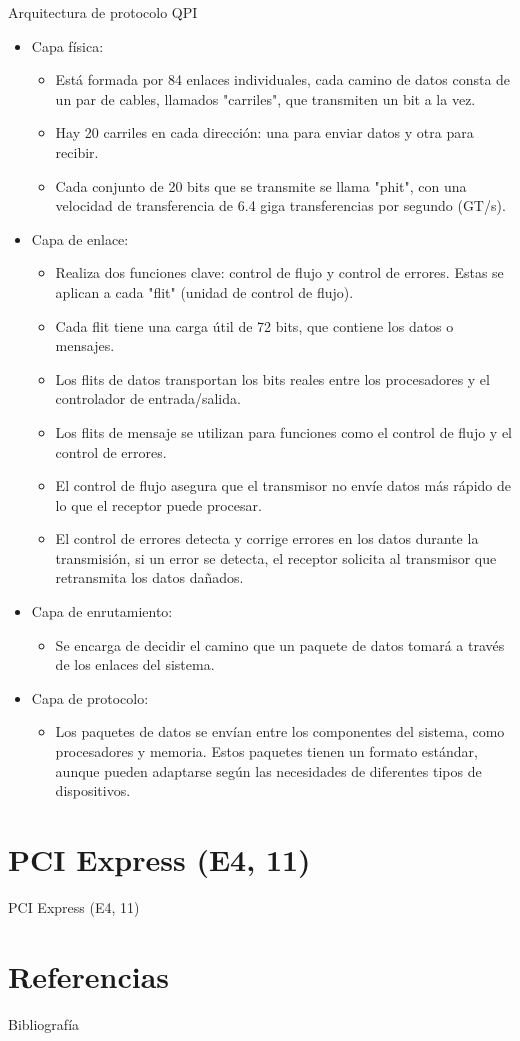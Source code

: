 \documentclass[presentation]{beamer}
\begin{document}
\begin{frame}[label={sec:org86886b9}]{Arquitectura de protocolo QPI}
\begin{itemize}
\item \alert{\alert{Capa física:}}
\begin{itemize}
\item Está formada por 84 enlaces individuales, cada camino de datos consta de un par de cables,
llamados "carriles", que transmiten un bit a la vez.
\item Hay 20 carriles en cada dirección: una para enviar datos y otra para recibir.
\item Cada conjunto de 20 bits que se transmite se llama "phit", con una velocidad de transferencia
de 6.4 giga transferencias por segundo (GT/s).
\end{itemize}
\item \alert{\alert{Capa de enlace:}}
\begin{itemize}
\item Realiza dos funciones clave: control de flujo y control de errores.
Estas se aplican a cada "flit" (unidad de control de flujo).
\item Cada flit tiene una carga útil de 72 bits, que contiene los datos o mensajes.
\item Los flits de datos transportan los bits reales entre los procesadores y el
controlador de entrada/salida.
\item Los flits de mensaje se utilizan para funciones como el control de flujo y
el control de errores.
\item El control de flujo asegura que el transmisor no envíe datos más rápido de
lo que el receptor puede procesar.
\item El control de errores detecta y corrige errores en los datos durante la
transmisión, si un error se detecta, el receptor solicita al transmisor
 que retransmita los datos dañados.
\end{itemize}
\item \alert{\alert{Capa de enrutamiento:}}
\begin{itemize}
\item Se encarga de decidir el camino que un paquete de datos tomará a través
de los enlaces del sistema.
\end{itemize}
\item \alert{\alert{Capa de protocolo:}}
\begin{itemize}
\item Los paquetes de datos se envían entre los componentes del sistema, como
procesadores y memoria. Estos paquetes tienen un formato estándar, aunque
      pueden adaptarse según las necesidades de diferentes tipos de dispositivos.
\end{itemize}
\end{itemize}
\end{frame}
\section{PCI Express (E4, 11)}
\label{sec:org416c751}
\begin{frame}[label={sec:orgbddeb5d}]{PCI Express (E4, 11)}
\end{frame}

\section{Referencias}
\label{sec:orga989a3d}
\begin{frame}[allowframebreaks]{Bibliografía}
\printbibliography
\end{frame}
\end{document}

